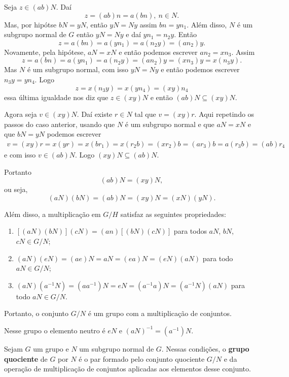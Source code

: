 Seja $z \in (ab)N$. Daí
\[
    z = (ab)n = a(bn),\ n \in N.
\]
Mas, por hipótse $bN = yN$, então $yN = Ny$ assim $bn = yn_1$. Além disso, $N$ é um subgrupo normal de $G$ então $yN = Ny$ e daí $yn_1 = n_2y$. Então
\[
    z = a(bn) = a(yn_1) = a(n_2y) = (an_2)y.
\]
Novamente, pela hipótese, $aN = xN$ e então podemos escrever $an_2 = xn_3$. Assim
\[
    z = a(bn) = a(yn_1) = a(n_2y) = (an_2)y = (xn_3)y = x(n_3y).
\]
Mas $N$ é um subgrupo normal, com isso $yN = Ny$ e então podemos escrever $n_3y = yn_4$. Logo
\[
    z = x(n_3y) = x(yn_4) = (xy)n_4
\]
essa última igualdade nos diz que $z \in (xy)N$ e então $(ab)N \subseteq (xy)N$.

Agora seja $v \in (xy)N$. Daí existe $r \in N$ tal que $v = (xy)r$. Aqui repetindo os passos do caso anterior, usando que $N$ é um subgrupo normal e que $aN = xN$ e que $bN = yN$ podemos escrever
\begin{align*}
    v = (xy)r = x(yr) = x(br_1) = x(r_2b) = (xr_2)b = (ar_3)b = a(r_3b) = (ab)r_4
\end{align*}
e com isso $v \in (ab)N$. Logo $(xy)N \subseteq (ab)N$.

Portanto
\[
    (ab)N = (xy)N,
\]
ou seja,
\[
    (aN)(bN) = (ab)N = (xy)N = (xN)(yN).
\]

Além disso, a multiplicação em $G/H$ satisfaz as seguintes propriedades:

\begin{enumerate}[label={\roman*})]
    \item $[(aN)(bN)](cN) = (an)[(bN)(cN)]$ para todos $aN$, $bN$, $cN \in G/N$;

    \item $(aN)(eN) = (ae)N = aN = (ea)N = (eN)(aN)$ para todo $aN \in G/N$;

    \item $(aN)(a^{-1}N) = (aa^{-1})N = eN = (a^{-1}a)N = (a^{-1}N)(aN)$ para todo $aN \in G/N$.
\end{enumerate}

Portanto, o conjunto $G/N$ é um grupo com a multiplicação de conjuntos.

Nesse grupo o elemento neutro é $eN$ e $(aN)^{-1} = (a^{-1})N$.

\begin{definicao}
    Sejam $G$ um grupo e $N$ um subgrupo normal de $G$. Nessas condições, o \textbf{grupo quociente}
    de $G$ por $N$ é o par formado pelo conjunto quociente $G/N$ e da operação de multiplicação de conjuntos
    aplicadas aos elementos desse conjunto.
\end{definicao}

